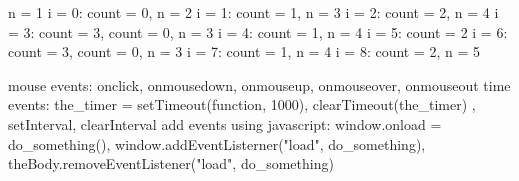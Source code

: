 n = 1
i = 0: count = 0, n = 2
i = 1: count = 1, n = 3
i = 2: count = 2, n = 4
i = 3: count = 3, count = 0, n = 3
i = 4: count = 1, n = 4
i = 5: count = 2
i = 6: count = 3, count = 0, n = 3
i = 7: count = 1, n = 4
i = 8: count = 2, n = 5

mouse events: onclick, onmousedown, onmouseup, onmouseover, onmouseout
time events: the_timer = setTimeout(function, 1000), clearTimeout(the_timer) , setInterval, clearInterval
add events using javascript: window.onload = do_something(), window.addEventListerner("load", do_something), theBody.removeEventListener("load", do_something)


